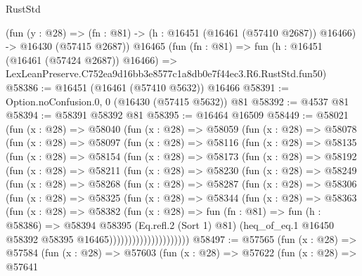 \begin{lexlean}{RustStd}
\begin{coremodule}
    (fun (y : @28) =>
    (fn : @81) -> (h : @16451 (@16461 (@57410 @2687)) @16466) -> @16430 (@57415 @2687))
    @16465
    (fun (fn : @81) =>
    fun (h : @16451 (@16461 (@57424 @2687)) @16466) =>
    LexLeanPreserve.C752ea9d16bb3e8577c1a8db0e7f44ec3.R6.RustStd.fun50)
@58386 := @16451 (@16461 (@57410 @5632)) @16466
@58391 := Option.noConfusion.{0, 0} (@16430 (@57415 @5632)) @81
@58392 := @4537 @81
@58394 := @58391 @58392 @81
@58395 := @16464 @16509
@58449 := @58021
    (fun (x : @28) =>
    @58040
      (fun (x : @28) =>
      @58059
        (fun (x : @28) =>
        @58078
          (fun (x : @28) =>
          @58097
            (fun (x : @28) =>
            @58116
              (fun (x : @28) =>
              @58135
                (fun (x : @28) =>
                @58154
                  (fun (x : @28) =>
                  @58173
                    (fun (x : @28) =>
                    @58192
                      (fun (x : @28) =>
                      @58211
                        (fun (x : @28) =>
                        @58230
                          (fun (x : @28) =>
                          @58249
                            (fun (x : @28) =>
                            @58268
                              (fun (x : @28) =>
                              @58287
                                (fun (x : @28) =>
                                @58306
                                  (fun (x : @28) =>
                                  @58325
                                    (fun (x : @28) =>
                                    @58344
                                      (fun (x : @28) =>
                                      @58363
                                        (fun (x : @28) =>
                                        @58382
                                          (fun (x : @28) =>
                                          fun (fn : @81) =>
                                          fun (h : @58386) =>
                                          @58394
                                            @58395
                                            (Eq.refl.{2} (Sort 1) @81)
                                            (heq_of_eq.{1}
                                              @16450
                                              @58392
                                              @58395
                                              @16465)))))))))))))))))))))
@58497 := @57565
    (fun (x : @28) =>
    @57584
      (fun (x : @28) =>
      @57603
        (fun (x : @28) =>
        @57622
          (fun (x : @28) =>
          @57641

\end{coremodule}
\end{lexlean}
